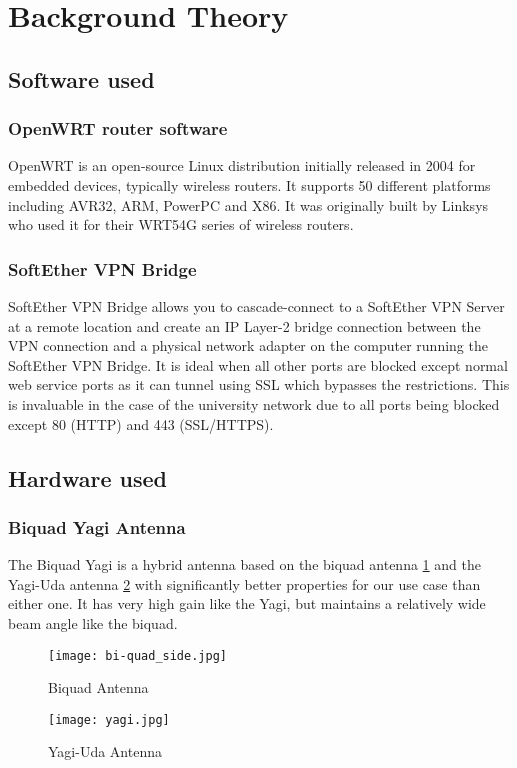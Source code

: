 \section{Background Theory}

\subsection{Software used}
\subsubsection{OpenWRT router software}
OpenWRT is an open-source Linux distribution initially released in 2004 for embedded devices, typically wireless routers. It supports 50 different platforms including AVR32, ARM, PowerPC and X86. It was originally built by Linksys who used it for their WRT54G series of wireless routers.

\subsubsection{SoftEther VPN Bridge}
\label{sec:comms_theory_vpn} %
SoftEther VPN Bridge allows you to cascade-connect to a SoftEther VPN Server at a remote location and create an IP Layer-2 bridge connection between the VPN connection and a physical network adapter on the computer running the SoftEther VPN Bridge. It is ideal when all other ports are blocked except normal web service ports as it can tunnel using SSL which bypasses the restrictions. This is invaluable in the case of the university network due to all ports being blocked except 80 (HTTP) and 443 (SSL/HTTPS).

\subsection{Hardware used}
\subsubsection{Biquad Yagi Antenna}
The Biquad Yagi is a hybrid antenna based on the biquad antenna \ref{fig:biquad} and the Yagi-Uda antenna \ref{fig:yagi} with significantly better properties for our use case than either one. It has very high gain like the Yagi, but maintains a relatively wide beam angle like the biquad. 

\begin{figure}[!htb]
\begin{center}
\texttt{[image: bi-quad\_side.jpg]}
\end{center}
\caption{Biquad Antenna}
\label{fig:biquad}
\end{figure}

\begin{figure}[!htb]
\begin{center}
\texttt{[image: yagi.jpg]}
\end{center}
\caption{Yagi-Uda Antenna}
\label{fig:yagi}
\end{figure}


